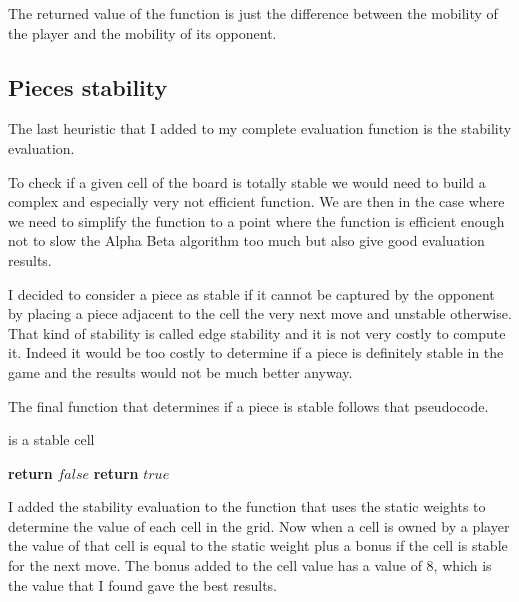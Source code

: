 The returned value of the function is just the difference between the mobility of the player and the mobility of its opponent.

\subsection{Pieces stability}

The last heuristic that I added to my complete evaluation function is the stability evaluation.

To check if a given cell of the board is totally stable we would need to build a complex and especially very not efficient function.
We are then in the case where we need to simplify the function to a point where the function is efficient enough not to slow the Alpha Beta algorithm too much but also give good evaluation results.

I decided to consider a piece as stable if it cannot be captured by the opponent by placing a piece adjacent to the cell the very next move and unstable otherwise.
That kind of stability is called edge stability and it is not very costly to compute it.
Indeed it would be too costly to determine if a piece is definitely stable in the game and the results would not be much better anyway.

The final function that determines if a piece is stable follows that pseudocode.

\FloatBarrier
\begin{algorithm}
    \caption{is a stable cell}
    \begin{algorithmic}[1]
                        \State \textbf{return} $false$
                    \EndIf
                \EndIf
            \EndFor
            \State \textbf{return} $true$
        \EndProcedure
    \end{algorithmic}
\end{algorithm}
\FloatBarrier

I added the stability evaluation to the function that uses the static weights to determine the value of each cell in the grid.
Now when a cell is owned by a player the value of that cell is equal to the static weight plus a bonus if the cell is stable for the next move.
The bonus added to the cell value has a value of 8, which is the value that I found gave the best results.

